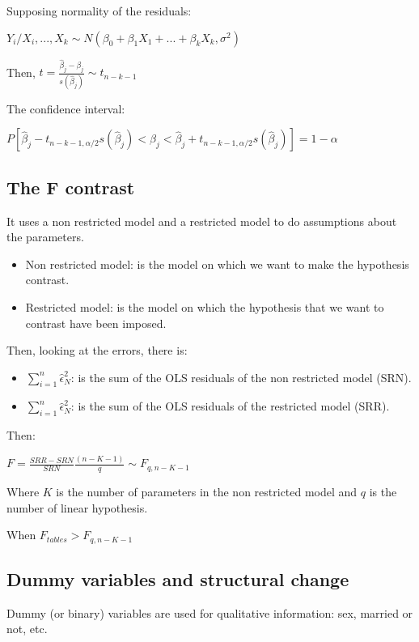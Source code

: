 \documentclass[10pt,landscape]{article}
\begin{document}
\begin{multicols}{3}
Supposing normality of the residuals:

$Y_i / X_i, ..., X_k \sim N(\beta_0 + \beta_1 X_1 + ... + \beta_k X_k, \sigma^2)$

Then, $t = \frac{\hat{\beta}_j - \beta_j}{s(\hat{\beta}_j)} \sim t_{n-k-1}$

The confidence interval:

$P[\hat{\beta}_j - t_{n-k-1, \alpha/2} s(\hat{\beta}_j) < \beta_j < \hat{\beta}_j + t_{n-k-1, \alpha/2} s(\hat{\beta}_j)] = 1 - \alpha$

\subsection*{The F contrast}

It uses a non restricted model and a restricted model to do assumptions about the parameters.

\begin{itemize}
\item Non restricted model: is the model on which we want to make the hypothesis contrast.
\item Restricted model: is the model on which the hypothesis that we want to contrast have been imposed.
\end{itemize}

Then, looking at the errors, there is:

\begin{itemize}
\item $\sum_{i=1}^n \hat{\epsilon}_N^2$: is the sum of the OLS residuals of the non restricted model (SRN).
\item $\sum_{i=1}^n \hat{\epsilon}_N^2$: is the sum of the OLS residuals of the restricted model (SRR).
\end{itemize}

Then:

$F = \frac{SRR - SRN}{SRN} \frac{(n-K-1)}{q} \sim F_{q, n-K-1}$

Where $K$ is the number of parameters in the non restricted model and $q$ is the number of linear hypothesis.

When $F_{tables} > F_{q, n-K-1}$

\subsection*{Dummy variables and structural change}

Dummy (or binary) variables are used for qualitative information: sex, married or not, etc.


\end{multicols}
\end{document}

